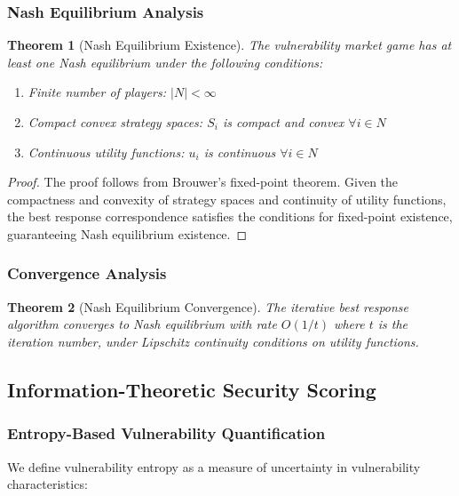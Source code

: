 \documentclass[journal]{IEEEtran}
\newtheorem{theorem}{Theorem}
\begin{document}
\subsubsection{Nash Equilibrium Analysis}

\begin{theorem}[Nash Equilibrium Existence]
The vulnerability market game has at least one Nash equilibrium under the following conditions:
\begin{enumerate}
\item Finite number of players: $|N| < \infty$
\item Compact convex strategy spaces: $S_i$ is compact and convex $\forall i \in N$
\item Continuous utility functions: $u_i$ is continuous $\forall i \in N$
\end{enumerate}
\end{theorem}

\begin{proof}
The proof follows from Brouwer's fixed-point theorem. Given the compactness and convexity of strategy spaces and continuity of utility functions, the best response correspondence satisfies the conditions for fixed-point existence, guaranteeing Nash equilibrium existence.
\end{proof}

\subsubsection{Convergence Analysis}

\begin{theorem}[Nash Equilibrium Convergence]
The iterative best response algorithm converges to Nash equilibrium with rate $O(1/t)$ where $t$ is the iteration number, under Lipschitz continuity conditions on utility functions.
\end{theorem}

\subsection{Information-Theoretic Security Scoring}

\subsubsection{Entropy-Based Vulnerability Quantification}

We define vulnerability entropy as a measure of uncertainty in vulnerability characteristics:
\end{document}
